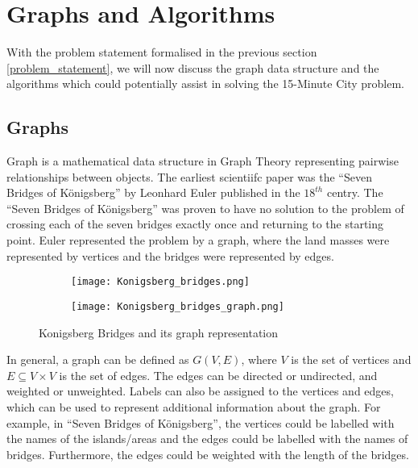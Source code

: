 \chapter{Graphs and Algorithms} \label{algorithms}

With the problem statement formalised in the previous section \ref{problem_statement}, we will now discuss the graph data structure and the algorithms which could potentially assist in solving the 15-Minute City problem.

\section{Graphs}

Graph is a mathematical data structure in Graph Theory representing pairwise relationships between objects. The earliest scientiifc paper was the ``Seven Bridges of Königsberg'' by Leonhard Euler published in the $18^{th}$ centry. The ``Seven Bridges of Königsberg'' was proven to have no solution to the problem of crossing each of the seven bridges exactly once and returning to the starting point. Euler represented the problem by a graph, where the land masses were represented by vertices and the bridges were represented by edges.


\begin{figure}[htbp]
    \centering
    \begin{subfigure}[c]{0.6\textwidth}
        \texttt{[image: Konigsberg\_bridges.png]}
    \end{subfigure}\hfill
    \begin{subfigure}[c]{0.4\textwidth}
        \texttt{[image: Konigsberg\_bridges\_graph.png]}
    \end{subfigure} \hfill
    \caption{Konigsberg Bridges and its graph representation}
    \label{fig:konigsberg_bridges}
\end{figure}

In general, a graph can be defined as $G(V,E)$, where $V$ is the set of vertices and $E\subseteq V\times V$ is the set of edges. The edges can be directed or undirected, and weighted or unweighted. Labels can also be assigned to the vertices and edges, which can be used to represent additional information about the graph. For example, in ``Seven Bridges of Königsberg'', the vertices could be labelled with the names of the islands/areas and the edges could be labelled with the names of bridges. Furthermore, the edges could be weighted with the length of the bridges.

